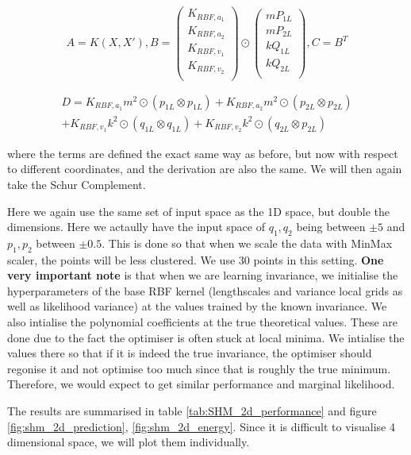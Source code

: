 \documentclass{statsmsc}
\begin{document}
$$
A=K(X, X'), 
B=\begin{pmatrix}
    K_{RBF, a_1}\\
    K_{RBF, a_2}\\
    K_{RBF, v_1}\\
    K_{RBF, v_2}\\
\end{pmatrix}\odot
\begin{pmatrix}
mP_{1L}  \\
mP_{2L}  \\
kQ_{1L}  \\
kQ_{2L}  \\
\end{pmatrix},
C=B^T 
$$

\begin{gather*}
D=K_{RBF,a_1}m^2\odot(p_{1L}\otimes p_{1L}) + K_{RBF,a_2}m^2\odot(p_{2L}\otimes p_{2L})\\+K_{RBF,v_1}k^2\odot(q_{1L}\otimes q_{1L})+K_{RBF,v_2}k^2\odot(q_{2L}\otimes p_{2L})
\end{gather*}

where the terms are defined the exact same way as before, but now with respect to different coordinates, and the derivation are also the same.
We will then again take the Schur Complement.

Here we again use the same set of input space as the 1D space, but double the dimensions. 
Here we actaully have the input space of $q_1, q_2$ being between $\pm 5$ and $p_1, p_2$ between $\pm 0.5$. 
This is done so that when we scale the data with MinMax scaler, the points will be less clustered.
We use 30 points in this setting.
\textbf{One very important note} is that when we are learning invariance, we initialise the hyperparameters of the base RBF kernel (lengthscales and variance local grids as well as likelihood variance) at the values trained by the known invariance.
We also intialise the polynomial coefficients at the true theoretical values.
These are done due to the fact the optimiser is often stuck at local minima.
We intialise the values there so that if it is indeed the true invariance, the optimiser should regonise it and not optimise too much since that is roughly the true minimum.
Therefore, we would expect to get similar performance and marginal likelihood.

The results are summarised in table \ref{tab:SHM_2d_performance} and figure \ref{fig:shm_2d_prediction}, \ref{fig:shm_2d_energy}.
Since it is difficult to visualise 4 dimensional space, we will plot them individually.
\end{document}
